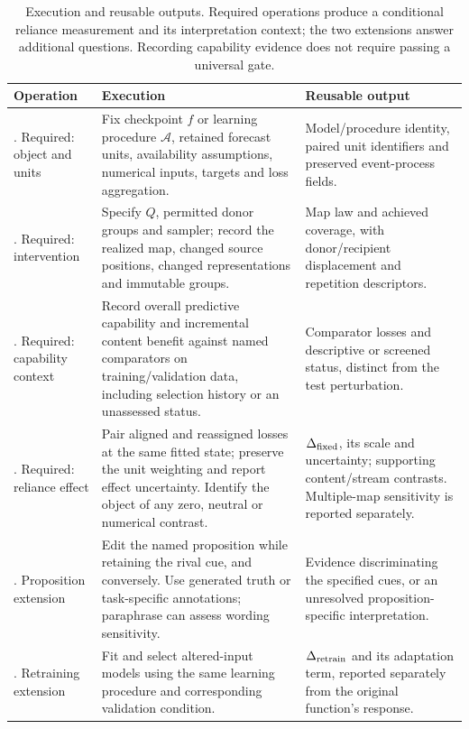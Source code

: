 \begin{table}[!ht]
\centering\small
\setlength{\tabcolsep}{4pt}
\renewcommand{\arraystretch}{1.12}
\caption{Execution and reusable outputs. Required operations produce a conditional reliance measurement and its interpretation context; the two extensions answer additional questions. Recording capability evidence does not require passing a universal gate.}
\label{tab:protocol_steps}
\begin{tabular}{@{}>{\raggedright\arraybackslash}p{}>{\raggedright\arraybackslash}p{}>{\raggedright\arraybackslash}p{}@{}}
\toprule
Operation & Execution & Reusable output\\
\midrule
1. Required: object and units & Fix checkpoint $f$ or learning procedure $\mathcal A$, retained forecast units, availability assumptions, numerical inputs, targets and loss aggregation. & Model/procedure identity, paired unit identifiers and preserved event-process fields.\\
2. Required: intervention & Specify $Q$, permitted donor groups and sampler; record the realized map, changed source positions, changed representations and immutable groups. & Map law and achieved coverage, with donor/recipient displacement and repetition descriptors.\\
3. Required: capability context & Record overall predictive capability and incremental content benefit against named comparators on training/validation data, including selection history or an unassessed status. & Comparator losses and descriptive or screened status, distinct from the test perturbation.\\
4. Required: reliance effect & Pair aligned and reassigned losses at the same fitted state; preserve the unit weighting and report effect uncertainty. Identify the object of any zero, neutral or numerical contrast. & $\Delta_{\mathrm{fixed}}$, its scale and uncertainty; supporting content/stream contrasts. Multiple-map sensitivity is reported separately.\\
5. Proposition extension & Edit the named proposition while retaining the rival cue, and conversely. Use generated truth or task-specific annotations; paraphrase can assess wording sensitivity. & Evidence discriminating the specified cues, or an unresolved proposition-specific interpretation.\\
6. Retraining extension & Fit and select altered-input models using the same learning procedure and corresponding validation condition. & $\Delta_{\mathrm{retrain}}$ and its adaptation term, reported separately from the original function's response.\\
\bottomrule
\end{tabular}
\end{table}

